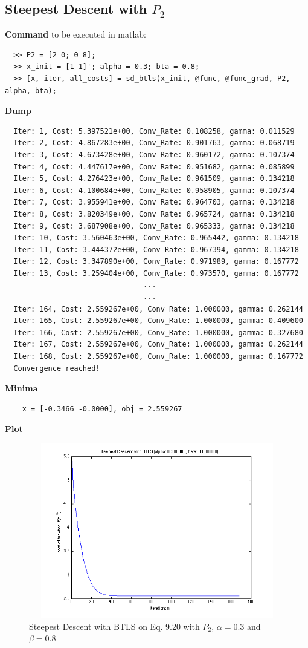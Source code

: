 \documentclass[11pt,a4paper]{article}
\begin{document}
\newpage 
\subsection{Steepest Descent with $P_2$}
{\bf Command} to be executed in matlab:
\begin{verbatim}
  >> P2 = [2 0; 0 8];
  >> x_init = [1 1]'; alpha = 0.3; bta = 0.8;
  >> [x, iter, all_costs] = sd_btls(x_init, @func, @func_grad, P2, alpha, bta);
\end{verbatim}
{\bf Dump}
\begin{verbatim}
  Iter: 1, Cost: 5.397521e+00, Conv_Rate: 0.108258, gamma: 0.011529
  Iter: 2, Cost: 4.867283e+00, Conv_Rate: 0.901763, gamma: 0.068719
  Iter: 3, Cost: 4.673428e+00, Conv_Rate: 0.960172, gamma: 0.107374
  Iter: 4, Cost: 4.447617e+00, Conv_Rate: 0.951682, gamma: 0.085899
  Iter: 5, Cost: 4.276423e+00, Conv_Rate: 0.961509, gamma: 0.134218
  Iter: 6, Cost: 4.100684e+00, Conv_Rate: 0.958905, gamma: 0.107374
  Iter: 7, Cost: 3.955941e+00, Conv_Rate: 0.964703, gamma: 0.134218
  Iter: 8, Cost: 3.820349e+00, Conv_Rate: 0.965724, gamma: 0.134218
  Iter: 9, Cost: 3.687908e+00, Conv_Rate: 0.965333, gamma: 0.134218
  Iter: 10, Cost: 3.560463e+00, Conv_Rate: 0.965442, gamma: 0.134218
  Iter: 11, Cost: 3.444372e+00, Conv_Rate: 0.967394, gamma: 0.134218
  Iter: 12, Cost: 3.347890e+00, Conv_Rate: 0.971989, gamma: 0.167772
  Iter: 13, Cost: 3.259404e+00, Conv_Rate: 0.973570, gamma: 0.167772
                                ...
                                ...
  Iter: 164, Cost: 2.559267e+00, Conv_Rate: 1.000000, gamma: 0.262144
  Iter: 165, Cost: 2.559267e+00, Conv_Rate: 1.000000, gamma: 0.409600
  Iter: 166, Cost: 2.559267e+00, Conv_Rate: 1.000000, gamma: 0.327680
  Iter: 167, Cost: 2.559267e+00, Conv_Rate: 1.000000, gamma: 0.262144
  Iter: 168, Cost: 2.559267e+00, Conv_Rate: 1.000000, gamma: 0.167772
  Convergence reached!
\end{verbatim}
{\bf Minima}
\begin{verbatim}
    x = [-0.3466 -0.0000], obj = 2.559267
   \end{verbatim}
{\bf Plot}
\begin{figure}[h]
    \centering
    \includegraphics[width=5in,height=3in]{../ps2_matlab/3.png}
    \caption{Steepest Descent with BTLS on
        Eq. 9.20 with $P_2$, $\alpha = 0.3$ and $\beta = 0.8$}
\end{figure}
\end{document}
